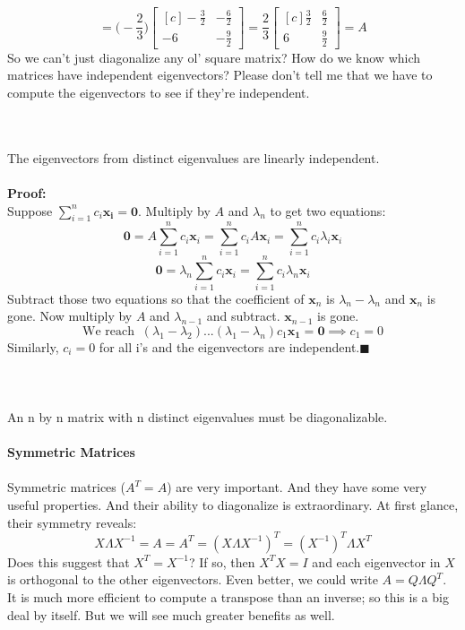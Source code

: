 \documentclass{tufte-handout}
\renewcommand{\qedsymbol}{$\blacksquare$}
\begin{document}
\[
=
\Big(-\frac{2}{3}\Big)
\begin{bmatrix*}[c] -\frac{3}{2}&-\frac{6}{2}\\-6&-\frac{9}{2} \end{bmatrix*}
=
\frac{2}{3}
\begin{bmatrix*}[c] \frac{3}{2}&\frac{6}{2}\\6&\frac{9}{2} \end{bmatrix*}
=A
\]
\[\]
\noindent So we can't just diagonalize any ol' square matrix? How do we know which matrices have independent eigenvectors? Please don't tell me that we have to compute the eigenvectors to see if they're independent.\\\leavevmode

\\\leavevmode\\
\noindent The eigenvectors from distinct eigenvalues are linearly independent.\\\leavevmode\\
\noindent\textbf{Proof:}\\
\noindent Suppose $\sum_{i=1}^{n}c_i\mathbf{x_i}=\mathbf{0}$. Multiply by $A$ and $\lambda_n$ to get two equations:
\[
\mathbf{0}=A\sum_{i=1}^{n}c_i\mathbf{x}_i
=\sum_{i=1}^{n}c_iA\mathbf{x}_i
=\sum_{i=1}^{n}c_i\lambda_i\mathbf{x}_i
\]
\[
\mathbf{0}=\lambda_n\sum_{i=1}^{n}c_i\mathbf{x}_i
=\sum_{i=1}^{n}c_i\lambda_n\mathbf{x}_i
\]
Subtract those two equations so that the coefficient of $\mathbf{x}_n$ is $\lambda_n-\lambda_n$ and $\mathbf{x}_n$ is gone. Now multiply by $A$ and $\lambda_{n-1}$ and subtract. $\mathbf{x}_{n-1}$ is gone.
\[
\text{We reach }~
(\lambda_1-\lambda_2)...(\lambda_1-\lambda_n)c_1\mathbf{x_1}=\mathbf{0}
\implies
c_1=0
\]
Similarly, $c_i=0$ for all i's and the eigenvectors are independent.\quad \qedsymbol\\\leavevmode\\

\\\leavevmode\\
\noindent An n by n matrix with n distinct eigenvalues must be diagonalizable.\\\leavevmode\\

\[\]
{\Large\textbf{Symmetric Matrices}}\\\leavevmode\\
\noindent Symmetric matrices ($A^T=A$) are very important. And they have some very useful properties. And their ability to diagonalize is extraordinary. At first glance, their symmetry reveals:
\[
X\Lambda X^{-1}=A=A^T=(X\Lambda X^{-1})^T=(X^{-1})^T\Lambda X^T
\]
Does this suggest that $X^T=X^{-1}$? If so, then $X^TX=I$ and each eigenvector in $X$ is orthogonal to the other eigenvectors. Even better, we could write $A=Q\Lambda Q^T$. It is much more efficient to compute a transpose than an inverse; so this is a big deal by itself. But we will see much greater benefits as well.
\end{document}
